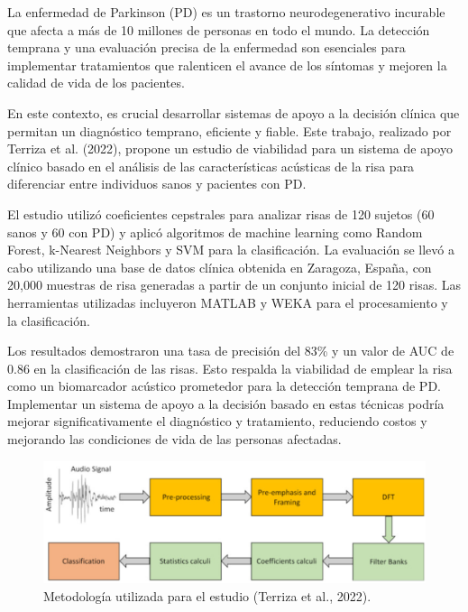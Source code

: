 \documentclass[listof=nochaptergap,12pt,times,authoryear]{report}
\begin{document}
La enfermedad de Parkinson (PD) es un trastorno neurodegenerativo incurable que afecta a más de 10 millones de personas en todo el mundo. La detección temprana y una evaluación precisa de la enfermedad son esenciales para implementar tratamientos que ralenticen el avance de los síntomas y mejoren la calidad de vida de los pacientes.

En este contexto, es crucial desarrollar sistemas de apoyo a la decisión clínica que permitan un diagnóstico temprano, eficiente y fiable. Este trabajo, realizado por Terriza et al. (2022), propone un estudio de viabilidad para un sistema de apoyo clínico basado en el análisis de las características acústicas de la risa para diferenciar entre individuos sanos y pacientes con PD.

El estudio utilizó coeficientes cepstrales para analizar risas de 120 sujetos (60 sanos y 60 con PD) y aplicó algoritmos de machine learning como Random Forest, k-Nearest Neighbors y SVM para la clasificación. La evaluación se llevó a cabo utilizando una base de datos clínica obtenida en Zaragoza, España, con 20,000 muestras de risa generadas a partir de un conjunto inicial de 120 risas. Las herramientas utilizadas incluyeron MATLAB y WEKA para el procesamiento y la clasificación. 

Los resultados demostraron una tasa de precisión del 83\% y un valor de AUC de 0.86 en la clasificación de las risas. Esto respalda la viabilidad de emplear la risa como un biomarcador acústico prometedor para la detección temprana de PD. Implementar un sistema de apoyo a la decisión basado en estas técnicas podría mejorar significativamente el diagnóstico y tratamiento, reduciendo costos y mejorando las condiciones de vida de las personas afectadas.

\begin{figure}[H]
    \centering
    \includegraphics[width=\textwidth]{A4 - 1.png}
    \caption{Metodología utilizada para el estudio (Terriza et al., 2022).}
    \label{fig:metodologia_risa}
\end{figure}
\end{document}
